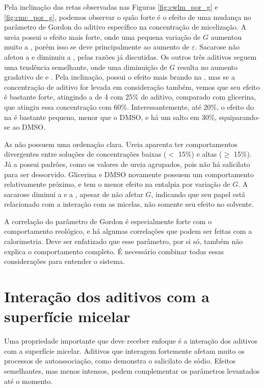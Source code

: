 		Pela inclinação das retas observadas nas Figuras \ref{fig:cwlm_por_g} e \ref{fig:cmc_por_g}, podemos observar o quão forte é o efeito de uma mudança no parâmetro de Gordon do aditivo específico na concentração de micelização. A ureia possui o efeito mais forte, onde uma pequena variação de \(G\) aumentou muito a \cmc, porém isso se deve principalmente ao aumento de \(\varepsilon\). Sacarose não afetou a \cwlm{} e diminuiu a \cmc, pelas razões já discutidas. Os outros três aditivos seguem uma tendência semelhante, onde uma diminuição de \(G\) resulta no aumento gradativo de \cwlm{} e \cmc. Pela inclinação, \BD{} possui o efeito mais brando na \cwlm, mas se a concentração de aditivo for levada em consideração também, vemos que seu efeito é bastante forte, atingindo a \cwlm{} de 4 \mM{} com 25\% de aditivo, comparado com glicerina, que atingiu essa concentração com 60\%. Interessantemente, até 20\%, o efeito do \BD{} na \cmc{} é bastante pequeno, menor que o DMSO, e há um salto em 30\%, equiparando-se ao DMSO.
				
		As \DHwlm{} não possuem uma ordenação clara. Ureia aparenta ter comportamentos divergentes entre soluções de concentrações baixas (\(<\) 15\%) e altas (\(\ge\) 15\%). Já a \DHmic{} possui padrões, como os valores de ureia agrupados, pois não há salicilato para ser dessorvido. Glicerina e DMSO novamente possuem um comportamento relativamente próximo, e \BD{} tem o menor efeito na entalpia por variação de \(G\). A sacarose diminui a \DHmic{} e a \cmc{}, apesar de não afetar \(G\), indicando que seu papel está relacionado com a interação com as micelas, não somente seu efeito no solvente.
		
		A correlação do parâmetro de Gordon é especialmente forte com o comportamento reológico, e há algumas correlações que podem ser feitas com a calorimetria. Deve ser enfatizado que esse parâmetro, por si só, também não explica o comportamento completo. É necessário combinar todas essas considerações para entender o sistema.
		\FloatBarrier
		
		\section{Interação dos aditivos com a superfície micelar}
		
		Uma propriedade importante que deve receber enfoque é a interação dos aditivos com a superfície micelar. Aditivos que interagem fortemente afetam muito os processos de autoassociação, como demonstra o salicilato de sódio. Efeitos semelhantes, mas menos intensos, podem complementar os parâmetros levantados até o momento.
		
